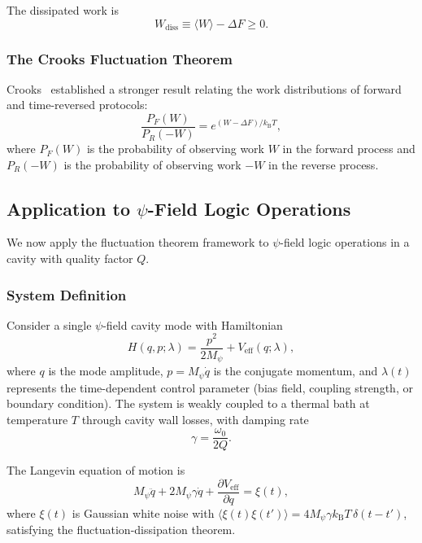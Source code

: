 \documentclass[11pt,twocolumn]{article}
\theoremstyle{definition}
\theoremstyle{remark}
\newcommand{\kB}{k_{\mathrm{B}}}
\begin{document}
The dissipated work is
\begin{equation}
W_{\mathrm{diss}} \equiv \langle W\rangle - \Delta F \geq 0.
\label{eq:wdiss}
\end{equation}

\subsubsection{The Crooks Fluctuation Theorem}

Crooks~\cite{Crooks1999} established a stronger result relating the
work distributions of forward and time-reversed protocols:
\begin{equation}
\frac{P_F(W)}{P_R(-W)} = e^{(W - \Delta F)/\kB T},
\label{eq:crooks}
\end{equation}
where $P_F(W)$ is the probability of observing work $W$ in the forward
process and $P_R(-W)$ is the probability of observing work $-W$ in the
reverse process.

\subsection{Application to $\psi$-Field Logic Operations}\label{sec:psi_jarzynski}

We now apply the fluctuation theorem framework to $\psi$-field logic
operations in a cavity with quality factor $Q$.

\subsubsection{System Definition}

Consider a single $\psi$-field cavity mode with Hamiltonian
\begin{equation}
H(q,p;\lambda) = \frac{p^2}{2M_\psi} + V_{\mathrm{eff}}(q;\lambda),
\label{eq:mode_ham}
\end{equation}
where $q$ is the mode amplitude, $p = M_\psi\dot{q}$ is the conjugate
momentum, and $\lambda(t)$ represents the time-dependent control
parameter (bias field, coupling strength, or boundary condition). The
system is weakly coupled to a thermal bath at temperature $T$ through
cavity wall losses, with damping rate
\begin{equation}
\gamma = \frac{\omega_0}{2Q}.
\label{eq:damping}
\end{equation}

The Langevin equation of motion is
\begin{equation}
M_\psi\ddot{q} + 2M_\psi\gamma\dot{q} + \frac{\partial V_{\mathrm{eff}}}{\partial q} = \xi(t),
\label{eq:langevin}
\end{equation}
where $\xi(t)$ is Gaussian white noise with
$\langle\xi(t)\xi(t')\rangle = 4M_\psi\gamma\kB T\,\delta(t-t')$,
satisfying the fluctuation-dissipation theorem.
\end{document}
